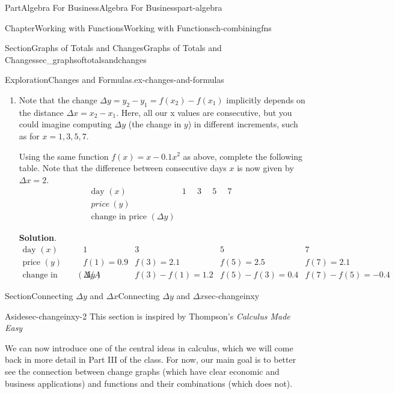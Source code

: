 \documentclass[oneside,10pt,]{tufte-book}
\newcommand{\blocktitlefont}{\relax}
\numberwithin{equation}{chapter}
\begin{document}
\begin{partptx}{Part}{Algebra For Business}{}{Algebra For Business}{}{}{part-algebra}
\begin{chapterptx}{Chapter}{Working with Functions}{}{Working with Functions}{}{}{ch-combiningfns}
\begin{sectionptx}{Section}{\textasteriskcentered{}Graphs of Totals and Changes}{}{\textasteriskcentered{}Graphs of Totals and Changes}{}{}{sec_graphsoftotalsandchanges}
\begin{exploration}{Exploration}{Changes and Formulas.}{ex-changes-and-formulas}
\begin{enumerate}[font=\bfseries,label=(\alph*),ref=\alph*]
\item{}Note that the change \(\Delta y = y_2 - y_1 = f(x_2) - f(x_1)\) implicitly depends on the distance \(\Delta x=x_2-x_1\). Here, all our x values are consecutive, but you could imagine computing \(\Delta y\) (the change in \(y\)) in different increments, such as for \(x=1,3,5,7\).%
\par
Using the same function \(f(x) = x-0.1x^{2}\) as above, complete the following table. Note that the difference between consecutive days \(x\) is now given by \(\Delta x = 2\).%
\begin{equation*}
\begin{array}{c|c|c|c|c}
\text{day }(x)
&  1 
&  3  
&  5 
&  7  
\\ \hline
price\ (y)
&  \quad
&  \quad
&  \quad
&  \quad
\\ \hline
\text{change in price }(\Delta y) 
&  
&  
&  
& 
\end{array}
\end{equation*}
%
\par\smallskip%
\noindent\textbf{\blocktitlefont Solution}.\hypertarget{ex-changes-and-formulas-4-2}{}\quad{}%
\begin{equation*}
\begin{array}{c|c|c|c|c|c|c|c}
\text{day }(x)
&  1 
&  3  
&  5 
&  7  
\\ \hline
\text{price }(y) 
&  f(1) = 0.9
&  f(3) = 2.1
&  f(5) = 2.5
&  f(7) = 2.1
\\ \hline
\text{change in price }(\Delta y) 
& N/A  
& f(3) - f(1) = 1.2
& f(5) - f(3) = 0.4
& f(7) - f(5) = -0.4
\end{array}
\end{equation*}
%
\end{enumerate}%
\end{exploration}%
\end{sectionptx}
%
%
\typeout{************************************************}
\typeout{************************************************}
%
\begin{sectionptx}{Section}{\textasteriskcentered{}Connecting \(\Delta y\) and \(\Delta x\)}{}{\textasteriskcentered{}Connecting \(\Delta y\) and \(\Delta x\)}{}{}{sec-changeinxy}
\begin{aside}{Aside}{}{sec-changeinxy-2}%
This section is inspired by Thompson's \emph{Calculus Made Easy}%
\end{aside}
We can now introduce one of the central ideas in calculus, which we will come back in more detail in Part III of the class. For now, our main goal is to better see the connection between change graphs (which have clear economic and business applications) and functions and their combinations (which does not).%

\end{sectionptx}
\end{chapterptx}
\end{partptx}
\end{document}
